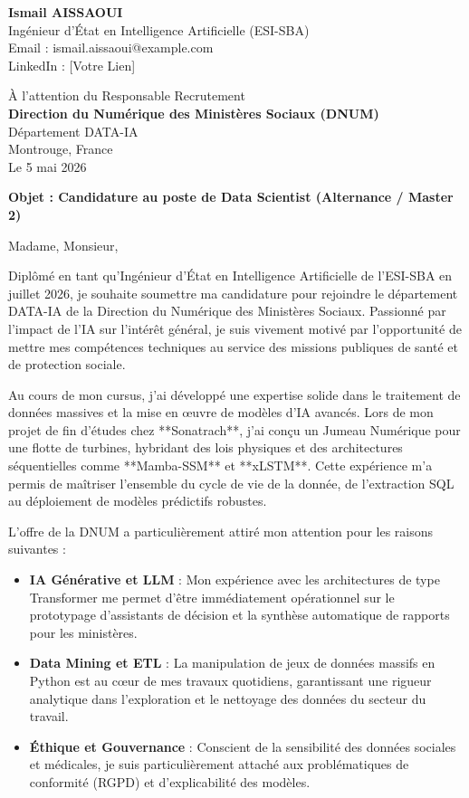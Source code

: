 \documentclass[11pt,a4paper]{article}
\begin{document}
\noindent \textbf{Ismail AISSAOUI} \\
Ingénieur d'État en Intelligence Artificielle (ESI-SBA) \\
Email : ismail.aissaoui@example.com \\
LinkedIn : [Votre Lien]

\bigskip

\begin{flushright}
    À l'attention du Responsable Recrutement \\
    \textbf{Direction du Numérique des Ministères Sociaux (DNUM)} \\
    Département DATA-IA \\
    Montrouge, France \\
    \medskip
    Le 5 mai 2026
\end{flushright}

\bigskip

\noindent \textbf{Objet : Candidature au poste de Data Scientist (Alternance / Master 2)}

\bigskip

Madame, Monsieur,

Diplômé en tant qu’Ingénieur d’État en Intelligence Artificielle de l’ESI-SBA en juillet 2026, je souhaite soumettre ma candidature pour rejoindre le département DATA-IA de la Direction du Numérique des Ministères Sociaux. Passionné par l’impact de l’IA sur l’intérêt général, je suis vivement motivé par l’opportunité de mettre mes compétences techniques au service des missions publiques de santé et de protection sociale.

Au cours de mon cursus, j'ai développé une expertise solide dans le traitement de données massives et la mise en œuvre de modèles d'IA avancés. Lors de mon projet de fin d'études chez **Sonatrach**, j'ai conçu un Jumeau Numérique pour une flotte de turbines, hybridant des lois physiques et des architectures séquentielles comme **Mamba-SSM** et **xLSTM**. Cette expérience m'a permis de maîtriser l'ensemble du cycle de vie de la donnée, de l'extraction SQL au déploiement de modèles prédictifs robustes.

L'offre de la DNUM a particulièrement attiré mon attention pour les raisons suivantes :
\begin{itemize}
    \item \textbf{IA Générative et LLM} : Mon expérience avec les architectures de type Transformer me permet d'être immédiatement opérationnel sur le prototypage d'assistants de décision et la synthèse automatique de rapports pour les ministères.
    \item \textbf{Data Mining et ETL} : La manipulation de jeux de données massifs en Python est au cœur de mes travaux quotidiens, garantissant une rigueur analytique dans l'exploration et le nettoyage des données du secteur du travail.
    \item \textbf{Éthique et Gouvernance} : Conscient de la sensibilité des données sociales et médicales, je suis particulièrement attaché aux problématiques de conformité (RGPD) et d'explicabilité des modèles.
\end{itemize}
\end{document}
